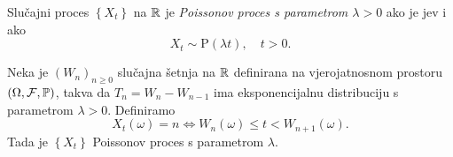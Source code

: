 \documentclass[main.tex]{subfiles}
\begin{document}
\begin{definicija}
	Slučajni proces \( \left\{ X_t \right\} \) na \( \R \) je \emph{Poissonov proces s parametrom \( \lambda > 0\)} ako je \levy jev i ako
	\begin{equation} \label{eq:poispois}
		X_t \sim \mathrm{P}(\lambda t), \quad t > 0.
	\end{equation}
\end{definicija}

\begin{teorem}
	Neka je \( (W_n)_{n \ge 0} \) slučajna šetnja na \( \R \) definirana na vjerojatnosnom prostoru
	\( (\Omega, \mathcal F, \P) \), takva da \( T_n = W_n - W_{n-1} \) ima eksponencijalnu distribuciju
	s parametrom \( \lambda > 0 \). Definiramo
	\begin{equation}\label{eq:poiscons}
		X_t(\omega) = n \iff W_n(\omega) \le t < W_{n+1}(\omega).
	\end{equation}
	Tada je \( \left\{ X_t \right\} \) Poissonov proces s parametrom \( \lambda \).
\end{teorem}
\end{document}
